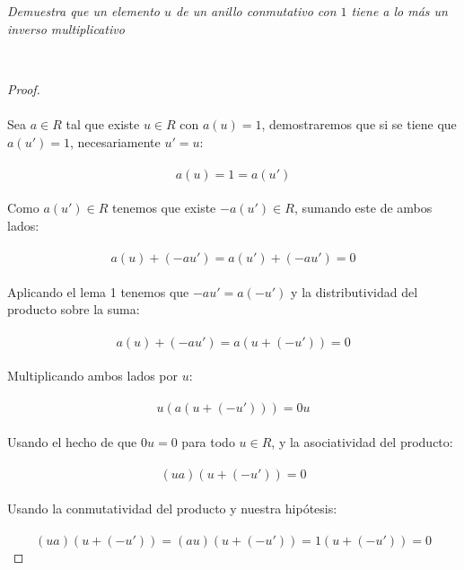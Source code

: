 \documentclass[11pt,letterpaper]{article}
\begin{document}
\begin{tcolorbox}[
	title = \textcolor{black}{\textcolor{white}{Problema 3}},]
\textit{Demuestra que un elemento $u$ de un anillo conmutativo con $1$ tiene a lo m\'as un inverso multiplicativo
}
\end{tcolorbox}\,\\
\begin{proof}\,\\
    \,\\
    Sea $a\in R$ tal que existe $u\in R$ con $a(u)=1$, demostraremos que si se tiene que $a(u')=1$, necesariamente $u'=u$:\,\\
    \,\\
    \begin{equation*}
        a(u)=1=a(u')
    \end{equation*}\,\\
    Como $a(u')\in R$ tenemos que existe $-a(u')\in R$, sumando este de ambos lados:\,\\
    \,\\
    \begin{equation*}
        a(u)+(-au')=a(u')+(-au')=0
    \end{equation*}\,\\
    Aplicando el lema 1 tenemos que $-au'=a(-u')$ y la distributividad del producto sobre la suma:\,\\
    \,\\
    \begin{equation*}
        a(u)+(-au')=a(u+(-u'))=0
    \end{equation*}\,\\
    Multiplicando ambos lados por $u$:\,\\
    \,\\
    \begin{equation*}
        u(a(u+(-u')))=0u
    \end{equation*}\,\\
    Usando el hecho de que $0u=0$ para todo $u\in R$, y la asociatividad del producto:\,\\
    \,\\
    \begin{equation*}
        (ua)(u+(-u'))=0
    \end{equation*}\,\\
    Usando la conmutatividad del producto y nuestra hip\'otesis:\,\\
    \,\\
    \begin{equation*}
        (ua)(u+(-u'))=(au)(u+(-u'))=1(u+(-u'))=0

\end{equation*}
\end{proof}
\end{document}
